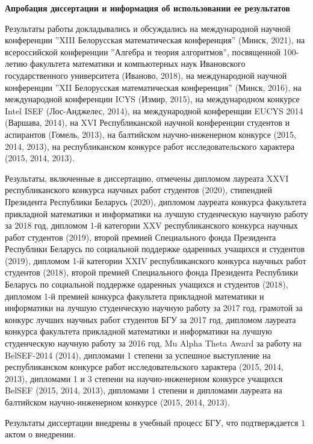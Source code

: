 \documentclass[_00_dissertation.tex]{subfiles}
\begin{document}
\begin{center}
\textbf{Апробация диссертации и информация об использовании ее результатов}
\end{center}

Результаты работы докладывались и обсуждались на международной научной конференции ''XIII Белорусская математическая конференция'' (Минск, 2021), на всероссийской конференции ''Алгебра и теория алгоритмов'', посвященной 100-летию факультета математики и компьютерных наук Ивановского государственного университета (Иваново, 2018), на международной научной конференции ''XII Белорусская математическая конференция'' (Минск, 2016), на международной конференции ICYS (Измир, 2015), на международном конкурсе Intel ISEF (Лос-Анджелес, 2014), на международной конференции EUCYS 2014 (Варшава, 2014), на XVI Республиканской научной конференции студентов и аспирантов (Гомель, 2013), на балтийском научно-инженерном конкурсе (2015, 2014, 2013), на республиканском конкурсе работ исследовательского характера (2015, 2014, 2013).

Результаты, включенные в диссертацию, отмечены дипломом лауреата XXVI республиканского конкурса научных работ студентов (2020), стипендией Президента Республики Беларусь (2020), дипломом лауреата конкурса факультета прикладной математики и информатики на лучшую студенческую научную работу за 2018 год, дипломом 1-й категории XXV республиканского конкурса научных работ студентов (2019), второй премией Специального фонда Президента Республики Беларусь по социальной поддержке одаренных учащихся и студентов (2019), дипломом 1-й категории XXIV республиканского конкурса научных работ студентов (2018), второй премией Специального фонда Президента Республики Беларусь по социальной поддержке одаренных учащихся и студентов (2018), дипломом 1-й премией конкурса факультета прикладной математики и информатики на лучшую студенческую научную работу за 2017 год, грамотой за конкурс лучших научных работ студентов БГУ за 2017 год, дипломом лауреата конкурса факультета прикладной математики и информатики на лучшую студенческую научную работу за 2016 год, Mu Alpha Theta Award за работу на BelSEF-2014 (2014), дипломами 1 степени за успешное выступление на республиканском конкурсе работ исследовательского характера (2015, 2014, 2013), дипломами 1 и 3 степени на научно-инженерном конкурсе учащихся BelSEF (2015, 2014, 2013), дипломами 1 степени и дипломами лауреата на балтийском научно-инженерном конкурсе (2015, 2014, 2013).

Результаты диссертации внедрены в учебный процесс БГУ, что подтверждается $1$ актом о внедрении.
\end{document}
